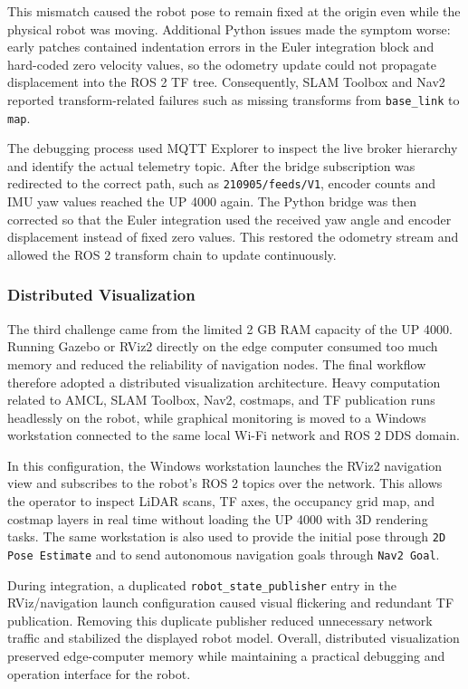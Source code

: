 \documentclass{llncs}
\begin{document}
This mismatch caused the robot pose to remain fixed at the origin even while the physical robot was moving. Additional Python issues made the symptom worse: early patches contained indentation errors in the Euler integration block and hard-coded zero velocity values, so the odometry update could not propagate displacement into the ROS 2 TF tree. Consequently, SLAM Toolbox and Nav2 reported transform-related failures such as missing transforms from \texttt{base\_link} to \texttt{map}.

The debugging process used MQTT Explorer to inspect the live broker hierarchy and identify the actual telemetry topic. After the bridge subscription was redirected to the correct path, such as \texttt{210905/feeds/V1}, encoder counts and IMU yaw values reached the UP 4000 again. The Python bridge was then corrected so that the Euler integration used the received yaw angle and encoder displacement instead of fixed zero values. This restored the odometry stream and allowed the ROS 2 transform chain to update continuously.

\subsubsection{Distributed Visualization}
The third challenge came from the limited 2 GB RAM capacity of the UP 4000. Running Gazebo or RViz2 directly on the edge computer consumed too much memory and reduced the reliability of navigation nodes. The final workflow therefore adopted a distributed visualization architecture. Heavy computation related to AMCL, SLAM Toolbox, Nav2, costmaps, and TF publication runs headlessly on the robot, while graphical monitoring is moved to a Windows workstation connected to the same local Wi-Fi network and ROS 2 DDS domain.

In this configuration, the Windows workstation launches the RViz2 navigation view and subscribes to the robot's ROS 2 topics over the network. This allows the operator to inspect LiDAR scans, TF axes, the occupancy grid map, and costmap layers in real time without loading the UP 4000 with 3D rendering tasks. The same workstation is also used to provide the initial pose through \texttt{2D Pose Estimate} and to send autonomous navigation goals through \texttt{Nav2 Goal}.

During integration, a duplicated \texttt{robot\_state\_publisher} entry in the RViz/navigation launch configuration caused visual flickering and redundant TF publication. Removing this duplicate publisher reduced unnecessary network traffic and stabilized the displayed robot model. Overall, distributed visualization preserved edge-computer memory while maintaining a practical debugging and operation interface for the robot.
\end{document}
